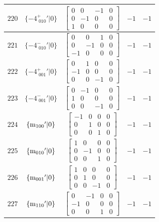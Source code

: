 \documentclass[fleqn,8pt]{jsarticle}
\begin{document}
\begin{longtable}{ccccc}
$ 220 $ & $ \{-4^{+}_{\,\,010}{}'|0\} $ & $ \begin{bmatrix} 0 & 0 & -1 & 0 \\ 0 & -1 & 0 & 0 \\ 1 & 0 & 0 & 0 \end{bmatrix} $ & $ -1 $ & $ -1 $ \\ \hline
$ 221 $ & $ \{-4^{-}_{\,\,010}{}'|0\} $ & $ \begin{bmatrix} 0 & 0 & 1 & 0 \\ 0 & -1 & 0 & 0 \\ -1 & 0 & 0 & 0 \end{bmatrix} $ & $ -1 $ & $ -1 $ \\ \hline
$ 222 $ & $ \{-4^{+}_{\,\,001}{}'|0\} $ & $ \begin{bmatrix} 0 & 1 & 0 & 0 \\ -1 & 0 & 0 & 0 \\ 0 & 0 & -1 & 0 \end{bmatrix} $ & $ -1 $ & $ -1 $ \\ \hline
$ 223 $ & $ \{-4^{-}_{\,\,001}{}'|0\} $ & $ \begin{bmatrix} 0 & -1 & 0 & 0 \\ 1 & 0 & 0 & 0 \\ 0 & 0 & -1 & 0 \end{bmatrix} $ & $ -1 $ & $ -1 $ \\ \hline
$ 224 $ & $ \{{\rm m}_{100}{}'|0\} $ & $ \begin{bmatrix} -1 & 0 & 0 & 0 \\ 0 & 1 & 0 & 0 \\ 0 & 0 & 1 & 0 \end{bmatrix} $ & $ -1 $ & $ -1 $ \\ \hline
$ 225 $ & $ \{{\rm m}_{010}{}'|0\} $ & $ \begin{bmatrix} 1 & 0 & 0 & 0 \\ 0 & -1 & 0 & 0 \\ 0 & 0 & 1 & 0 \end{bmatrix} $ & $ -1 $ & $ -1 $ \\ \hline
$ 226 $ & $ \{{\rm m}_{001}{}'|0\} $ & $ \begin{bmatrix} 1 & 0 & 0 & 0 \\ 0 & 1 & 0 & 0 \\ 0 & 0 & -1 & 0 \end{bmatrix} $ & $ -1 $ & $ -1 $ \\ \hline
$ 227 $ & $ \{{\rm m}_{110}{}'|0\} $ & $ \begin{bmatrix} 0 & -1 & 0 & 0 \\ -1 & 0 & 0 & 0 \\ 0 & 0 & 1 & 0 \end{bmatrix} $ & $ -1 $ & $ -1 $ \\ \hline

\end{longtable}
\end{document}
